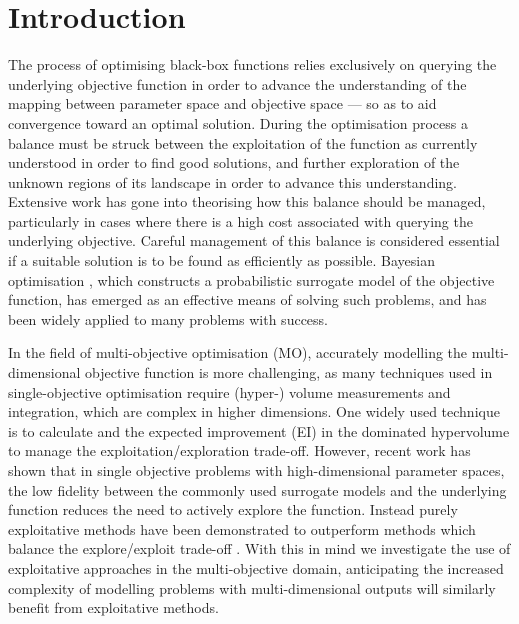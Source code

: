 \documentclass[conference]{IEEEtran}
\newcommand\ei{EI\xspace}
\begin{document}
\section{Introduction}
The process of optimising black-box functions relies exclusively on querying the underlying objective function in order to advance the understanding of the mapping between parameter space and objective space  --- so as to aid convergence toward an optimal solution. During the optimisation process a balance must be struck between the exploitation of the function as currently understood in order to find good solutions, and further exploration of the unknown regions of its landscape in order to advance this understanding. Extensive work has gone into theorising how this balance should be managed, particularly in cases where there is a high cost associated with querying the underlying objective. Careful management of this balance is considered essential if a suitable solution is to be found as efficiently as possible. Bayesian optimisation \cite{jones1998efficient}, which constructs a probabilistic surrogate model of the objective function, has emerged as an effective means of solving such problems, and has been widely applied to many problems with success.

In the field of multi-objective optimisation (MO), accurately modelling the multi-dimensional objective function is more challenging, as many techniques used in single-objective optimisation require (hyper-) volume measurements and integration, which are complex in higher dimensions. One widely used technique is to calculate and the expected improvement (\ei) \cite{jones1998efficient} in the dominated hypervolume to manage the exploitation/exploration trade-off. However, recent work has shown that in single objective problems with high-dimensional parameter spaces, the low fidelity between the commonly used surrogate models and the underlying function reduces the need to actively explore the function. Instead purely exploitative methods have been demonstrated to outperform methods which balance the explore/exploit trade-off \cite{death2019greed}. With this in mind we investigate the use of exploitative approaches in the multi-objective domain, anticipating the increased complexity of modelling problems with multi-dimensional outputs will similarly benefit from exploitative methods. 
\end{document}
